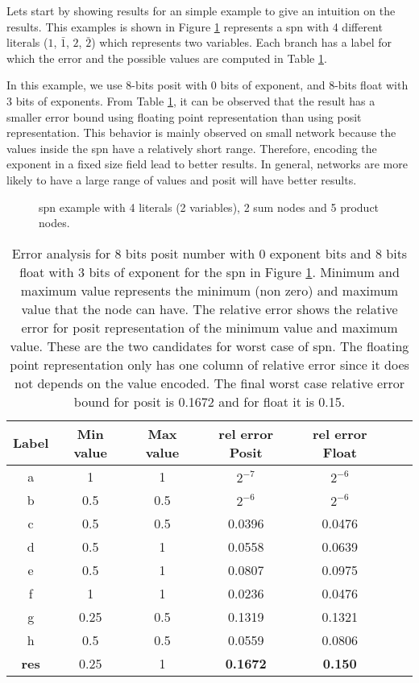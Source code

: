 Lets start by showing results for an simple example to give an intuition on the results. This examples is shown in Figure \ref{fig:example_03} represents a \gls{spn} with 4 different literals ($1$, $\bar{1}$, $2$, $\bar{2}$) which represents two variables. Each branch has a label for which the error and the possible values are computed in Table \ref{tab:example_03}.

In this example, we use 8-bits posit with 0 bits of exponent, and 8-bits float with 3 bits of exponents. From Table \ref{tab:example_03}, it can be observed that the result has a smaller error bound using floating point representation than using posit representation. This behavior is mainly observed on small network because the values inside the \gls{spn} have a relatively short range. Therefore, encoding the exponent in a fixed size field lead to better results. In general, networks are more likely to have a large range of values and posit will have better results.

\begin{figure}[!ht]
\begin{mdframed}
	\centering
	
	\caption{\gls{spn} example with 4 literals (2 variables), 2 sum nodes and 5 product nodes.}
	\label{fig:example_03}
\end{mdframed}
\end{figure}

\begin{table}[!ht]
	\caption{Error analysis for 8 bits posit number with 0 exponent bits and 8 bits float with 3 bits of exponent for the \gls{spn} in Figure \ref{fig:example_03}. Minimum and maximum value represents the minimum (non zero) and maximum value that the node can have. The relative error shows the relative error for posit representation of the minimum value and maximum value. These are the two candidates for worst case of \gls{spn}. The floating point representation only has one column of relative error since it does not depends on the value encoded. The final worst case relative error bound for posit is 0.1672 and for float it is 0.15.}
	\label{tab:example_03}
	\centering
	\begin{tabular}{|c||c|c||c||c|c||c|}
	\hline
		Label & Min value & Max value & rel error Posit & rel error Float\\ \hline
		a & 1 & 1 & $2^{-7}$ & $2^{-6}$ \\ \hline
		b & 0.5 & 0.5 & $2^{-6}$ & $2^{-6}$\\ \hline
		c & 0.5 & 0.5 & 0.0396 & 0.0476 \\ \hline
		d & 0.5 & 1 & 0.0558 & 0.0639 \\ \hline
		e & 0.5 & 1 & 0.0807 & 0.0975 \\ \hline
		f & 1 & 1 & 0.0236 & 0.0476 \\ \hline
		g & 0.25 & 0.5 & 0.1319 & 0.1321 \\ \hline
		h & 0.5 & 0.5 & 0.0559 & 0.0806 \\ \hline \hline
		\textbf{res} & 0.25 & 1 &  \textbf{0.1672} & \textbf{0.150} \\ \hline
	\end{tabular}
\end{table}

